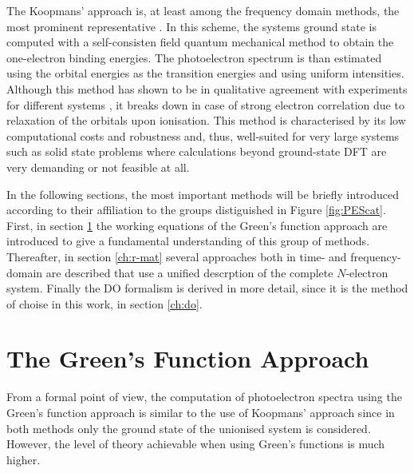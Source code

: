 The Koopmans' approach is, at least among the frequency domain methods, the most prominent representative \cite{Koerzd1,PottsHolland,dos,dos2}.
In this scheme, the systems ground state is computed with a self-consisten field quantum mechanical method to obtain the one-electron binding energies.
The photoelectron spectrum is than estimated using the orbital energies as the transition energies and using uniform intensities.
Although this method has shown to be in qualitative agreement with experiments for different systems \cite{Koerzd1,Koerzd2, EggerKronik,PottsHolland,YepesJaque}, it breaks down in case of strong electron correlation \cite{2phcederbaum,2phcederbaum2} due to relaxation of the orbitals upon ionisation.
This method is characterised by its low computational costs and robustness and, thus, well-suited for very large systems such as solid state problems where calculations beyond ground-state DFT are very demanding or not feasible at all.

In the following sections, the most important methods will be briefly introduced according to their affiliation to the groups distiguished in Figure \ref{fig:PEScat}.
First, in section \ref{ch:gf} the working equations of the Green's function approach are introduced to give a fundamental understanding of this group of methods.
Thereafter, in section \ref{ch:r-mat} several approaches both in time- and frequency-domain are described that use a unified descrption of the complete $N$-electron system.
Finally the DO formalism is derived in more detail, since it is the method of choise in this work, in section \ref{ch:do}.

\section{The Green's Function Approach}
\label{ch:gf}
From a formal point of view, the computation of photoelectron spectra using the Green's function approach is similar to the use of Koopmans' approach since in both methods only the ground state of the unionised system is considered.
However, the level of theory achievable when using Green's functions is much higher.

